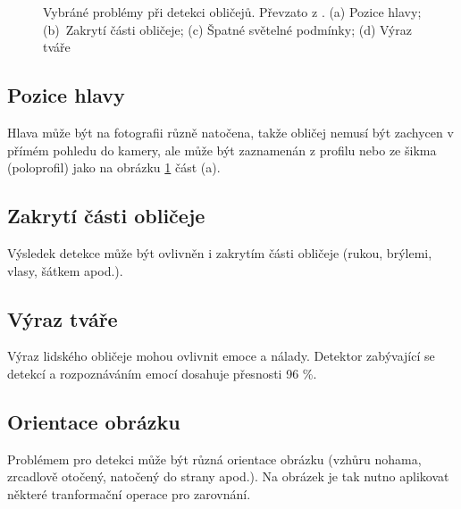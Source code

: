 \begin{figure}[H]
  \begin{center}
  \label{fdproblems}
  \caption{Vybráné problémy při detekci obličejů. Převzato z \cite{frReview}. (a) Pozice hlavy; (b)~Zakrytí části obličeje; (c) Špatné světelné podmínky; (d) Výraz tváře}
  \end{center}
\end{figure}

\subsection*{Pozice hlavy}
Hlava může být na fotografii různě natočena, takže obličej nemusí být zachycen v přímém pohledu do kamery, ale může být zaznamenán z profilu nebo ze šikma (poloprofil) jako na obrázku \ref{fdproblems} část (a).

\subsection*{Zakrytí části obličeje}
Výsledek detekce může být ovlivněn i zakrytím části obličeje (rukou, brýlemi, vlasy, šátkem apod.).

\subsection*{Výraz tváře}
Výraz lidského obličeje mohou ovlivnit emoce a nálady. Detektor zabývající se detekcí a rozpoznáváním emocí \cite{emotionDetector} dosahuje přesnosti 96 \%.

\subsection*{Orientace obrázku}
Problémem pro detekci může být různá orientace obrázku (vzhůru nohama, zrcadlově otočený, natočený do strany apod.). Na obrázek je tak nutno aplikovat některé tranformační operace pro zarovnání.


